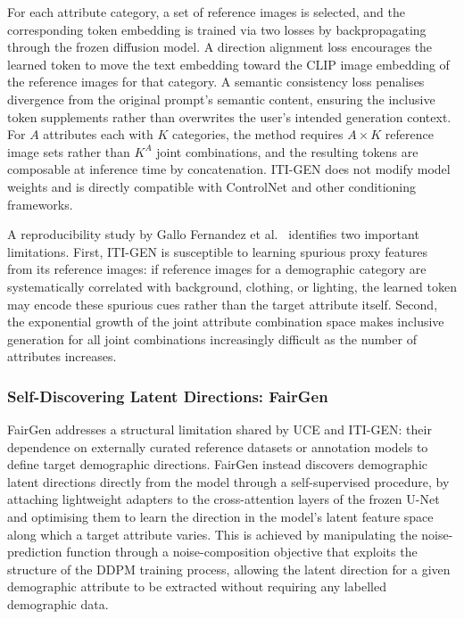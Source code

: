 For each attribute category, a set of reference images is selected, and the corresponding token embedding is trained via two losses by backpropagating through the frozen diffusion model. A direction alignment loss encourages the learned token to move the text embedding toward the CLIP image embedding of the reference images for that category. A semantic consistency loss penalises divergence from the original prompt's semantic content, ensuring the inclusive token supplements rather than overwrites the user's intended generation context. For $A$ attributes each with $K$ categories, the method requires $A \times K$ reference image sets rather than $K^A$ joint combinations, and the resulting tokens are composable at inference time by concatenation. ITI-GEN does not modify model weights and is directly compatible with ControlNet \cite{LZhang_2023_ControlNet} and other conditioning frameworks.

A reproducibility study by Gallo Fernandez et al.~\cite{GalloFernandez_2024_ITIGENRepro} identifies two important limitations. First, ITI-GEN is susceptible to learning spurious proxy features from its reference images: if reference images for a demographic category are systematically correlated with background, clothing, or lighting, the learned token may encode these spurious cues rather than the target attribute itself. Second, the exponential growth of the joint attribute combination space makes inclusive generation for all joint combinations increasingly difficult as the number of attributes increases.

\subsubsection*{Self-Discovering Latent Directions: FairGen}
\label{subsubsec:fairgen}

FairGen \cite{Jiang_2025_FairGen} addresses a structural limitation shared by UCE and ITI-GEN: their dependence on externally curated reference datasets or annotation models to define target demographic directions. FairGen instead discovers demographic latent directions directly from the model through a self-supervised procedure, by attaching lightweight adapters to the cross-attention layers of the frozen U-Net and optimising them to learn the direction in the model's latent feature space along which a target attribute varies. This is achieved by manipulating the noise-prediction function through a noise-composition objective that exploits the structure of the DDPM training process, allowing the latent direction for a given demographic attribute to be extracted without requiring any labelled demographic data.

